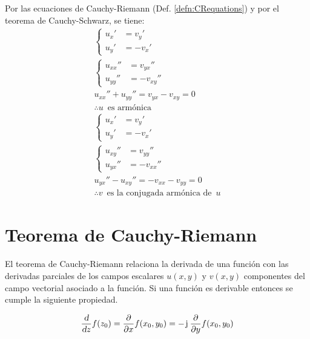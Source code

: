 Por las ecuaciones de Cauchy-Riemann (Def. \ref{defn:CRequations}) y por el teorema de Cauchy-Schwarz, se tiene:
\begin{gather*}
    \left\{
    \begin{aligned}
        u_x' &= v_y'
        \\
        u_y' &= -v_x'
    \end{aligned}
    \right.
    \\[1ex]
    \left\{
    \begin{aligned}
        u_{xx}'' &= v_{yx}''
        \\
        u_{yy}'' &= -v_{xy}''
    \end{aligned}
    \right.
    \\[1ex]
    u_{xx}'' + u_{yy}''= v_{yx} - v_{xy} = 0
    \\
    \therefore u \enspace \textrm{es armónica}
    \\[1ex]
    \left\{
    \begin{aligned}
        u_x' &= v_y'
        \\
        u_y' &= -v_x'
    \end{aligned}
    \right.
    \\[1ex]
    \left\{
    \begin{aligned}
        u_{xy}'' &= v_{yy}''
        \\
        u_{yx}'' &= - v_{xx}''
    \end{aligned}
    \right.
    \\[1ex]
    u_{yx}'' - u_{xy}'' = - v_{xx} - v_{yy} = 0
    \\
    \therefore v \enspace \textrm{es la conjugada armónica de} \enspace u
\end{gather*}


\section{Teorema de Cauchy-Riemann}

El teorema de Cauchy-Riemann relaciona la derivada de una función con las derivadas parciales de los campos escalares $u(x,y)$ y $v(x,y)$ componentes del campo vectorial asociado a la función.
Si una función es derivable entonces se cumple la siguiente propiedad.

\begin{mdframed}[style=PropertyFrame]
    \begin{prop}
        \label{prop:CRtheorem}
    \end{prop}
    \begin{equation*}
        \frac{\textsl{d}}{\textsl{d} z} f(z_0)= \frac{\partial}{\partial x} f(x_0,y_0)= -\mkern2mu\mathrm{j}\mkern1mu \, \frac{\partial}{\partial y} f(x_0,y_0)
    \end{equation*}
\end{mdframed}

